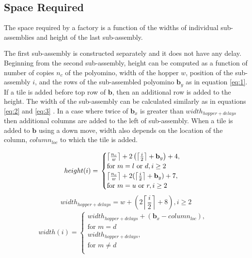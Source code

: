 \subsection{Space Required}\label{sec:requiredSpace}
The space required by a factory is a function of the widths of individual sub-assemblies and height of the last sub-assembly.


The first sub-assembly is constructed separately and it does not have any delay.
Beginning from the second sub-assembly, height can be computed as a function of number of copies $n_c$ of the polyomino, width of the hopper $w$, position of the sub-assembly $i$, and the rows of the sub-assembled polyomino $\mathbf{b}_y$ as in equation \ref{eq:1}. If a tile is added before top row of $\mathbf{b}$, then an additional row is added to the height.
The width of the sub-assembly can be calculated similarly as in equations \ref{eq:2} and \ref{eq:3} . 
In a case where twice of $\mathbf{b}_x$ is greater than $width_{hopper+delays}$ then additional columns are added to the left of sub-assembly. 
When a tile is added to $\mathbf{b}$ using a down move, width also depends on the location of the column, $column_{loc}$ to which the tile is added.  


\begin{align}\label{eq:1}
height(i)=
\newline\newline
\begin{cases}
\left \lceil{   \frac{n_c}{w}}\right \rceil+2\left(\left \lceil{\frac{i}{2}}\right \rceil+\mathbf{b}_y\right)+4,&\\ 
\text{for } m = l \text{ or } d, i \geq 2&\\
\left \lceil{   \frac{n_c}{w}}\right \rceil+2(\left \lceil{\frac{i}{2}}\right \rceil+\mathbf{b}_y)+7,&\\ 
\text{for } m = u \text{ or } r, i \geq 2&\\
\end{cases}
\end{align}
\begin{equation}\label{eq:2}
width_{hopper+delays}=w+(2\left \lceil{ \frac{i}{2}}\right \rceil+8),  i \geq 2
\end{equation}
\begin{align}\label{eq:3}
width(i)=
\begin{cases}
width_{hopper+delays}+(\mathbf{b}_x-column_{loc}),&\\ 
\text{for } m = d &\\
width_{hopper+delays},&\\ 
\text{for } m \neq d &\\
\end{cases}
\end{align}
  


